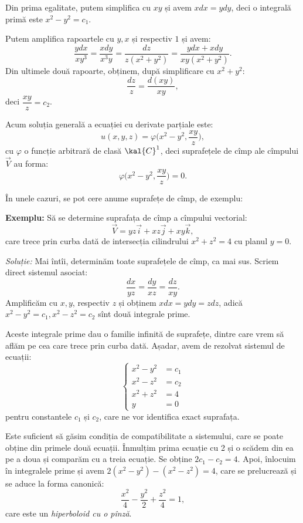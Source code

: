 Din prima egalitate, putem simplifica cu $ xy $ și avem $ xdx = ydy $, deci
o integrală primă este $ x^2 - y^2 = c_1 $.

Putem amplifica rapoartele cu $ y, x $ și respectiv $ 1 $ și avem:
\[
  \dfrac{ydx}{xy^3} = \dfrac{xdy}{x^3y} = \dfrac{dz}{z(x^2 + y^2)} = %
  \dfrac{ydx + xdy}{xy(x^2 + y^2)}.
\]
Din ultimele două rapoarte, obținem, după simplificare cu $ x^2 + y^2 $:
\[
  \dfrac{dz}{z} = \dfrac{d(xy)}{xy},
\]
deci $ \dfrac{xy}{z} = c_2 $.

Acum soluția generală a ecuației cu derivate parțiale este:
\[
  u(x, y, z) = \varphi\Big(x^2 - y^2, \dfrac{xy}{z} \Big),
\]
cu $ \varphi $ o funcție arbitrară de clasă $ \kal{C}^1 $, deci suprafețele de
cîmp ale cîmpului $ \vec{V} $ au forma:
\[
  \varphi\Big( x^2 - y^2, \dfrac{xy}{z} \Big) = 0.
\]

\vspace{1cm}

În unele cazuri, se pot cere anume suprafețe de cîmp, de exemplu:

\textbf{Exemplu:} Să se determine suprafața de cîmp a cîmpului vectorial:
\[
  \vec{V} = yz\vec{i} + xz \vec{j} + xy\vec{k},
\]
care trece prin curba dată de intersecția cilindrului $ x^2 + z^2 = 4 $ cu
planul $ y = 0 $.

\emph{Soluție:} Mai întîi, determinăm toate suprafețele de cîmp, ca mai sus.
Scriem direct sistemul asociat:
\[
  \dfrac{dx}{yz} = \dfrac{dy}{xz} = \dfrac{dz}{xy}.
\]
Amplificăm cu $ x, y $, respectiv $ z $ și obținem $ xdx = ydy = zdz $, adică
$ x^2 - y^2 = c_1, x^2 - z^2 = c_2 $ sînt două integrale prime.

Aceste integrale prime dau o familie infinită de suprafețe, dintre care
vrem să aflăm pe cea care trece prin curba dată. Așadar, avem de rezolvat
sistemul de ecuații:
\[
  \begin{cases}
    x^2 - y^2 &= c_1  \\
    x^2 - z^2 &= c_2 \\
    x^2 + z^2 &= 4 \\
    y &= 0
  \end{cases}
\]
pentru constantele $ c_1 $ și $ c_2 $, care ne vor identifica exact suprafața.

Este suficient să găsim condiția de compatibilitate a sistemului, care se poate
obține din primele două ecuații. Înmulțim prima ecuație cu 2 și o scădem din ea
pe a doua și comparăm cu a treia ecuație. Se obține $ 2c_1 - c_2 = 4 $.
Apoi, înlocuim în integralele prime și avem $ 2(x^2 - y^2) - (x^2 - z^2) = 4 $, care
se prelucrează și se aduce la forma canonică:
\[
  \dfrac{x^2}{4} - \dfrac{y^2}{2} + \dfrac{z^2}{4} = 1,
\]
care este un \emph{hiperboloid cu o pînză}.

